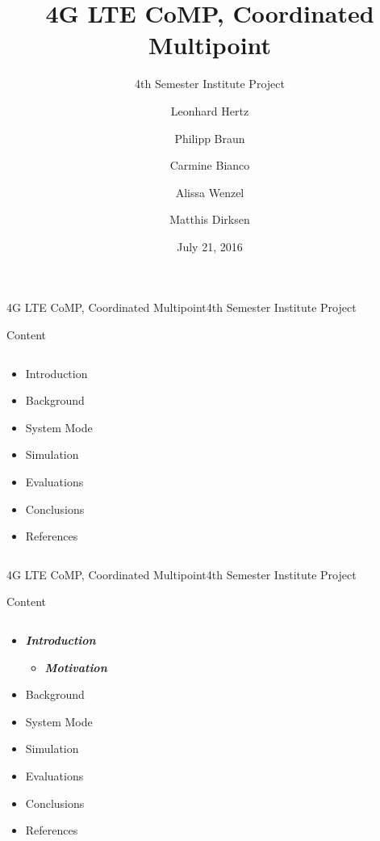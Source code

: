 \documentclass[xcolor={cmyk}]{beamer}
\title{4G LTE CoMP, Coordinated Multipoint}
\subtitle{4th Semester Institute Project}
\author[Matthis Dirksen]{\tiny Leonhard Hertz \and Philipp Braun \and Carmine Bianco \and Alissa Wenzel \and Matthis Dirksen}
\date{July 21, 2016}
\begin{document}
\frame[plain]{\titlepage}

\begin{comment}
 
 \begin{frame}{4G LTE CoMP, Coordinated Multipoint}{4th Semester Institute Project}
	 \begin{block}{...}
	
	 \end{block}
 \end{frame}
 
 \end{comment}

\begin{frame}{4G LTE CoMP, Coordinated Multipoint}{4th Semester Institute Project}
	\begin{block}{Content}
		\begin{columns}
			\begin{column}{.9\textwidth}
				\begin{itemize}
					\item Introduction
					\item Background
					\item System Mode
					\item Simulation
					\item Evaluations
					\item Conclusions
					\item References
				\end{itemize}
			\end{column}
		\end{columns}
	\end{block}
\end{frame}

\begin{frame}{4G LTE CoMP, Coordinated Multipoint}{4th Semester Institute Project}
	\begin{block}{Content}
		\begin{columns}
			\begin{column}{.9\textwidth}
				\begin{itemize}
					\item \textbf{\emph{Introduction}}
					\begin{itemize}
						\item \textbf{\emph{Motivation}}
					\end{itemize}
					\item Background
					\item System Mode
					\item Simulation
					\item Evaluations
					\item Conclusions
					\item References
				\end{itemize}
			\end{column}
		\end{columns}
	\end{block}
\end{frame}
\end{document}
